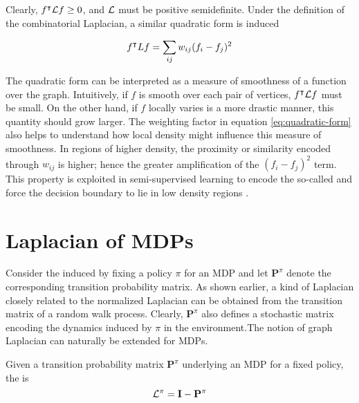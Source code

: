 Clearly, $f^\intercal \mathbf{\mathcal{L}} f \geq 0$, and $\mathbf{\mathcal{L}}$ must be positive
semidefinite. Under the definition of the combinatorial Laplacian, a similar quadratic
form is induced \parencite{Mohar91}

\begin{equation}
f^\intercal L f = \sum_{ij} w_{ij} (f_i - f_j)^2
\end{equation}

The quadratic form can be interpreted as a measure of smoothness of a  function over
the graph. Intuitively, if $f$ is smooth over each pair of vertices, $f^\intercal
\mathbf{\mathcal{L}} f$ must be small. On the other hand, if $f$ locally varies is a more drastic
manner, this quantity should grow larger. The weighting factor in equation
\ref{eq:quadratic-form} also helps to understand how local density might influence this
measure of smoothness. In regions of higher density, the proximity or similarity
encoded through $w_{ij}$ is higher; hence the greater amplification of the $(f_i - f_j)^2$
term. This property is exploited in semi-supervised learning to encode the so-called  and force the decision boundary to lie in low density regions \cite{Chapelle2002}.


\section{Laplacian of MDPs}
Consider the \mrp induced by fixing a policy $\pi$ for an MDP and let $\mathbf{P}^\pi$
denote the corresponding transition probability matrix. As shown earlier, a kind of
Laplacian closely related to the normalized Laplacian can be obtained from the transition
matrix of a random walk process. Clearly, $\mathbf{P}^\pi$ also defines a stochastic
matrix encoding the dynamics induced by $\pi$ in the environment.The notion of graph Laplacian can
naturally be extended for MDPs. 

\begin{defn}
Given a transition probability matrix $\mathbf{P}^\pi$ underlying an MDP for a fixed
policy, the  is
\begin{equation}
\mathbf{\mathcal{L}}^\pi = \mathbf{I} - \mathbf{P}^\pi
\label{eq:mdp-graph-laplacian}
\end{equation}
\end{defn} 

